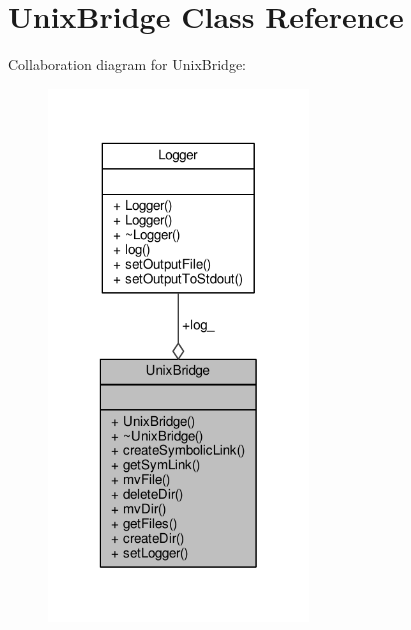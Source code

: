 \hypertarget{classUnixBridge}{\section{Unix\-Bridge Class Reference}
\label{classUnixBridge}
}


Collaboration diagram for Unix\-Bridge\-:\nopagebreak
\begin{figure}[H]
\begin{center}
\leavevmode
\includegraphics[width=196pt]{classUnixBridge__coll__graph}
\end{center}
\end{figure}
